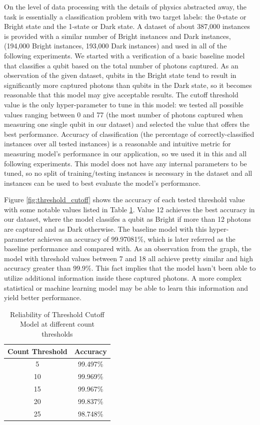 \documentclass[letterpaper,twocolumn,10pt]{article}
\begin{document}
On the level of data processing with the details of physics abstracted away, the task is essentially a classification problem with two target labels: the 0-state or Bright state and the 1-state or Dark state. A dataset of about 387,000 instances is provided with a similar number of Bright instances and Dark instances, (194,000 Bright instances, 193,000 Dark instances) and used in all of the following experiments. We started with a verification of a basic baseline model that classifies a qubit based on the total number of photons captured. As an observation of the given dataset, qubits in the Bright state tend to result in significantly more captured photons than qubits in the Dark state, so it becomes reasonable that this model may give acceptable results. The cutoff threshold value is the only hyper-parameter to tune in this model: we tested all possible values ranging between 0 and 77 (the most number of photons captured when measuring one single qubit in our dataset) and selected the value that offers the best performance. Accuracy of classification (the percentage of correctly-classified instances over all tested instances) is a reasonable and intuitive metric for measuring model's performance in our application, so we used it in this and all following experiments. This model does not have any internal parameters to be tuned, so no split of training/testing instances is necessary in the dataset and all instances can be used to best evaluate the model's performance.

Figure \ref{fig:threshold_cutoff} shows the accuracy of each tested threshold value with some notable values listed in Table \ref{table:threshold_cutoff}. Value 12 achieves the best accuracy in our dataset, where the model classifes a qubit as Bright if more than 12 photons are captured and as Dark otherwise. The baseline model with this hyper-parameter achieves an accuracy of 99.97081\%, which is later referred as the baseline performance and compared with. As an observation from the graph, the model with threshold values between 7 and 18 all achieve pretty similar and high accuracy greater than 99.9\%. This fact implies that the model hasn't been able to utilize additional information inside these captured photons. A more complex statistical or machine learning model may be able to learn this information and yield better performance. 

\begin{table}
    \caption{Reliability of Threshold Cutoff Model at different count thresholds}
    \begin{center}
        \begin{tabular}{c c}
            Count Threshold & Accuracy \\ [0.5ex] 
            \hline
            5 & 99.497\% \\ 
            10 & 99.969\% \\
            15 & 99.967\% \\
            20 & 99.837\% \\
            25 & 98.748\% \\
       \end{tabular}
    \end{center}
    \label{table:threshold_cutoff}  
\end{table}
\end{document}
